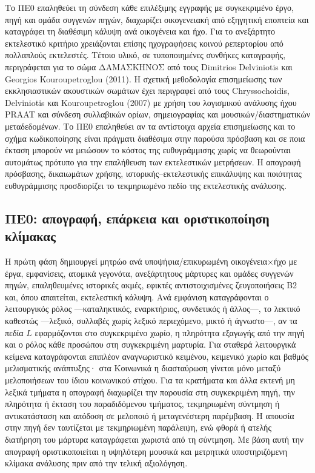 \documentclass[11pt,a4paper]{article}
\begin{document}
Το ΠΕ0 επαληθεύει τη σύνδεση κάθε επιλέξιμης εγγραφής με συγκεκριμένο έργο, πηγή και ομάδα συγγενών πηγών, διαχωρίζει οικογενειακή από εξηγητική εποπτεία και καταγράφει τη διαθέσιμη κάλυψη ανά οικογένεια και ήχο. Για το ανεξάρτητο εκτελεστικό κριτήριο χρειάζονται επίσης ηχογραφήσεις κοινού ρεπερτορίου από πολλαπλούς εκτελεστές. Τέτοιο υλικό, σε τυποποιημένες συνθήκες καταγραφής, περιγράφεται για το σώμα ΔΑΜΑΣΚΗΝΟΣ από τους Dimitrios Delviniotis και Georgios Kouroupetroglou (2011). Η σχετική μεθοδολογία επισημείωσης των εκκλησιαστικών ακουστικών σωμάτων έχει περιγραφεί από τους Chryssochoidis, Delviniotis και Kouroupetroglou (2007) με χρήση του λογισμικού ανάλυσης ήχου PRAAT και σύνδεση συλλαβικών ορίων, σημειογραφίας και μουσικών/διαστηματικών μεταδεδομένων. Το ΠΕ0 επαληθεύει αν τα αντίστοιχα αρχεία επισημείωσης και το σχήμα κωδικοποίησης είναι πράγματι διαθέσιμα στην παρούσα πρόσβαση και σε ποια έκταση μπορούν να μειώσουν το κόστος της ευθυγράμμισης χωρίς να θεωρούνται αυτομάτως πρότυπο για την επαλήθευση των εκτελεστικών μετρήσεων. Η απογραφή πρόσβασης, δικαιωμάτων χρήσης, ιστορικής--εκτελεστικής επικάλυψης και ποιότητας ευθυγράμμισης προσδιορίζει το τεκμηριωμένο πεδίο της εκτελεστικής ανάλυσης.

\subsection{ΠΕ0: απογραφή, επάρκεια και οριστικοποίηση κλίμακας}\label{sec:pilot-decision}

Η πρώτη φάση δημιουργεί μητρώο ανά υποψήφια/επικυρωμένη οικογένεια×ήχο με έργα, εμφανίσεις, ατομικά γεγονότα, ανεξάρτητους μάρτυρες και ομάδες συγγενών πηγών, επαληθευμένες ιστορικές ακμές, εφικτές αντιστοιχισμένες ζευγοποιήσεις B2 και, όπου απαιτείται, εκτελεστική κάλυψη. Ανά εμφάνιση καταγράφονται ο λειτουργικός ρόλος ---καταληκτικός, εναρκτήριος, συνδετικός ή άλλος---, το λεκτικό καθεστώς ---λεξικό, συλλαβές χωρίς λεξικό περιεχόμενο, μικτό ή άγνωστο---, αν τα πεδία $L$ εφαρμόζονται στο συγκεκριμένο χωρίο, η πληρότητα εξαγωγής από την πηγή και ο ρόλος κάθε προσώπου στη συγκεκριμένη μαρτυρία. Για σταθερά λειτουργικά κείμενα καταγράφονται επιπλέον αναγνωριστικό κειμένου, κειμενικό χωρίο και βαθμός μελισματικής ανάπτυξης· στα Κοινωνικά η διασταύρωση γίνεται μόνο μεταξύ μελοποιήσεων του ίδιου κοινωνικού στίχου. Για τα κρατήματα και άλλα εκτενή μη λεξικά τμήματα η απογραφή διαχωρίζει την παρουσία στη συγκεκριμένη πηγή, την πληρότητα ή έκταση του παραδιδόμενου τμήματος, τεκμηριωμένη σύντμηση ή αντικατάσταση και απόδοση σε μελοποιό ή μεταγενέστερη παρέμβαση. Η απουσία στην πηγή δεν ταυτίζεται με τεκμηριωμένη παράλειψη, ενώ φθορά ή ατελής διατήρηση του μάρτυρα καταγράφεται χωριστά από τη σύντμηση. Με βάση αυτή την απογραφή οριστικοποιείται η υψηλότερη μουσικά και μετρητικά υποστηριζόμενη κλίμακα ανάλυσης πριν από την τελική αξιολόγηση.
\end{document}

